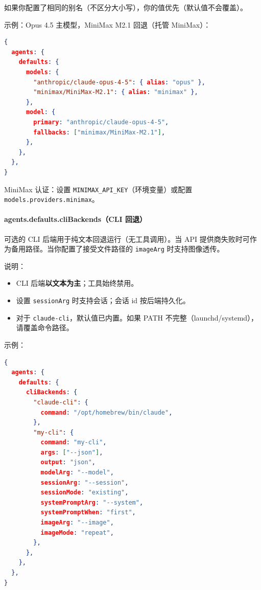 如果你配置了相同的别名（不区分大小写），你的值优先（默认值不会覆盖）。

示例：Opus 4.5 主模型，MiniMax M2.1 回退（托管 MiniMax）：

\begin{lstlisting}[language=json]
{
  agents: {
    defaults: {
      models: {
        "anthropic/claude-opus-4-5": { alias: "opus" },
        "minimax/MiniMax-M2.1": { alias: "minimax" },
      },
      model: {
        primary: "anthropic/claude-opus-4-5",
        fallbacks: ["minimax/MiniMax-M2.1"],
      },
    },
  },
}
\end{lstlisting}


MiniMax 认证：设置 \texttt{MINIMAX\_API\_KEY}（环境变量）或配置 \texttt{models.providers.minimax}。

\paragraph{agents.defaults.cliBackends（CLI 回退）}


可选的 CLI 后端用于纯文本回退运行（无工具调用）。当 API 提供商失败时可作为备用路径。当你配置了接受文件路径的 \texttt{imageArg} 时支持图像透传。

说明：

\begin{itemize}
  \item CLI 后端\textbf{以文本为主}；工具始终禁用。
  \item 设置 \texttt{sessionArg} 时支持会话；会话 id 按后端持久化。
  \item 对于 \texttt{claude-cli}，默认值已内置。如果 PATH 不完整（launchd/systemd），请覆盖命令路径。
\end{itemize}


示例：

\begin{lstlisting}[language=json]
{
  agents: {
    defaults: {
      cliBackends: {
        "claude-cli": {
          command: "/opt/homebrew/bin/claude",
        },
        "my-cli": {
          command: "my-cli",
          args: ["--json"],
          output: "json",
          modelArg: "--model",
          sessionArg: "--session",
          sessionMode: "existing",
          systemPromptArg: "--system",
          systemPromptWhen: "first",
          imageArg: "--image",
          imageMode: "repeat",
        },
      },
    },
  },
}
\end{lstlisting}



